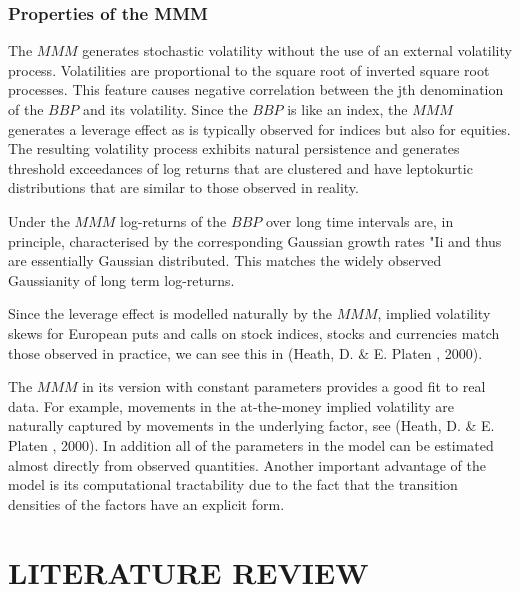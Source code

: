 \documentclass[a4 paper, 12pt]{report}
\theoremstyle{plain}
\begin{document}
\subsection{Properties of the MMM}
\noindent
\par The $MMM$ generates stochastic volatility without the use of an external volatility
process. Volatilities are proportional to the square root of inverted square root
processes. This feature causes negative correlation between the jth denomination of the
$BBP$ and its volatility. Since the $BBP$ is like an index, the $MMM$ generates a leverage effect
as is typically observed for indices but also for equities. The resulting volatility process
exhibits natural persistence and generates threshold exceedances of log returns that are
clustered and have leptokurtic distributions that are similar to those observed in reality.\\
\par Under the $MMM$ log-returns of the $BBP$ over long time intervals are, in principle,
characterised by the corresponding Gaussian growth rates "Ii and thus are essentially
Gaussian distributed. This matches the widely observed Gaussianity of long term log-returns.\\
\par Since the leverage effect is modelled naturally by the $MMM$, implied volatility
skews for European puts and calls on stock indices, stocks and currencies match those
observed in practice, we can see this in (Heath, D. \& E. Platen , 2000).\\
\par The $MMM$ in its version with constant parameters provides a good fit to real data.
For example, movements in the at-the-money implied volatility are naturally captured by
movements in the underlying factor, see (Heath, D. \& E. Platen , 2000). In addition all of
the parameters in the model can be estimated almost directly from observed quantities.
Another important advantage of the model is its computational tractability due to the
fact that the transition densities of the factors have an explicit form.

\chapter{LITERATURE REVIEW}
\end{document}
